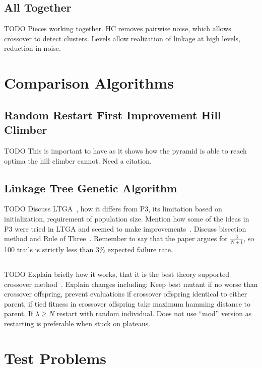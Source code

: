 \documentclass{sig-alternate}
\begin{document}
\subsection{All Together}
TODO Pieces working together.  HC removes pairwise noise, which allows crossover to detect
clusters.  Levels allow realization of linkage at high levels, reduction in noise.

\section{Comparison Algorithms}

\subsection{Random Restart First Improvement Hill Climber}
TODO This is important to have as it shows how the pyramid is able to reach optima
the hill climber cannot.  Need a citation.

\subsection{Linkage Tree Genetic Algorithm}
TODO Discuss LTGA~\cite{thierens:2013:ltgahiff}, how it differs from P3, its limitation based on
initialization, requirement of population size.  Mention how some
of the ideas in P3 were tried in LTGA and seemed to make improvements~\cite{goldman:2012:ltga}.
Discuss bisection method and Rule of Three~\cite{jovanovic:1997:ruleofthree}.
Remember to say that the paper argues for $\frac{3}{N+1}$, so 100 trails is strictly
less than $3\%$ expected failure rate.

\subsection{}
TODO Explain briefly how it works, that it is the best theory supported crossover method~\cite{doerr:2013:lambdalambda}.
Explain changes including: Keep best mutant if no worse than crossover offspring,
prevent evaluations if crossover offspring identical to either parent, if tied fitness
in crossover offspring take maximum hamming distance to parent.  If $\lambda \ge N$
restart with random individual.  Does not use ``mod'' version as restarting is preferable
when stuck on plateaus.

\section{Test Problems}
\end{document}
